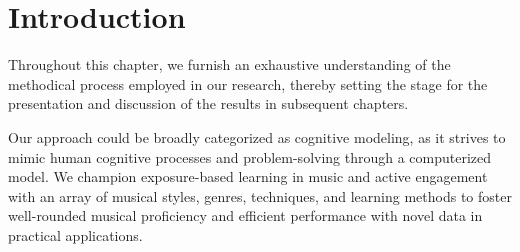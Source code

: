 \section{Introduction}


Throughout this chapter, we furnish an exhaustive understanding of the methodical process employed in our research, thereby setting the stage for the presentation and discussion of the results in subsequent chapters.

Our approach could be broadly categorized as cognitive modeling, as it strives to mimic human cognitive processes and problem-solving through a computerized model. We champion exposure-based learning in music and active engagement with an array of musical styles, genres, techniques, and learning methods to foster well-rounded musical proficiency and efficient performance with novel data in practical applications.


